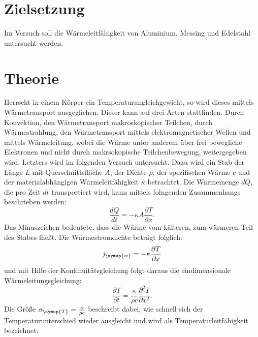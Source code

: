 \section{Zielsetzung}
Im Versuch soll die Wärmeleitfähigkeit von Aluminium, Messing und Edelstahl untersucht werden.

\section{Theorie}
Herrscht in einem Körper ein Temperaturungleichgewicht, so wird dieses mittels Wärmetransport
ausgeglichen. Dieser kann auf drei Arten stattfinden. Durch Konvektion, den Wärmetransport
makroskopischer Teilchen, durch Wärmestrahlung, den Wärmetransport mittels elektromagnetischer
Wellen und mittels Wärmeleitung, wobei die Wärme unter anderem über frei bewegliche Elektronen
und nicht durch makrsokopische Teilchenbewegung, weitergegeben wird.
Letzters wird im folgenden Versuch untersucht.
Dazu wird ein Stab der Länge $L$ mit Querschnittsfläche $A$, der Dichte $\rho$, der spezifischen
Wärme $c$ und der materialabhängigen Wärmeleitfähigkeit $\kappa$ betrachtet.
Die Wärmemenge $dQ$, die pro Zeit $dt$ transportiert wird, kann mittels folngenden
Zusammenhangs beschrieben werden:
\begin{equation*}
  \frac{dQ}{dt} = - \kappa A \frac{\partial T}{\partial x} .
\end{equation*}
Das Minuszeichen bedeutete, dass die Wärme vom kälteren, zum wärmeren Teil des Stabes fließt.
Die Wärmestromdichte beträgt folglich:
\begin{equation*}
  j_\symup{w} = - \kappa \frac{\partial T}{\partial x}
\end{equation*}
und mit Hilfe der Kontinuitätsgleichung folgt daraus die eindimensionale Wärmeleitungsgleichung:
\begin{equation*}
  \frac{\partial T}{\partial t} = \frac{\kappa}{\rho c} \frac{\partial^2 T}{\partial x^2}.
\end{equation*}
Die Größe $\sigma_\symup{T} = \frac{\kappa}{\rho c}$ beschreibt dabei, wie schnell sich
der Temperaturunterschied wieder ausgleicht und wird als Temperaturleitfähigkeit bezeichnet.

